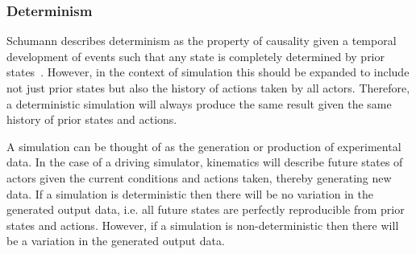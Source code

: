 \documentclass[letterpaper, 10 pt, journal, twoside]{IEEEtran}
\begin{document}
\subsubsection{Determinism}
Schumann describes determinism as the property of causality given a temporal development of events such that any state is completely determined by prior states~\cite{Schumann2010}. However, in the context of simulation this should be expanded to include not just prior states but also the history of actions taken by all actors. Therefore, a deterministic simulation will always produce the same result given the same history of prior states and actions.
% 

A simulation can be thought of as the generation or production of experimental data. 
%
In the case of a driving simulator, kinematics will describe future states of actors given the current conditions and actions taken, thereby generating new data. 
%
If a simulation is deterministic then there will be no variation in the generated output data, i.e. all future states are perfectly reproducible from prior states and actions. 
%
However, if a simulation is non-deterministic then there will be a variation in the generated output data. \\
\end{document}
